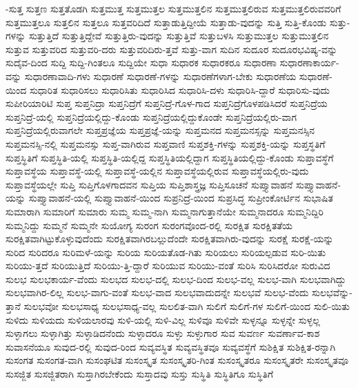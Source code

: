{-ಸುತ್ತ
ಸುತ್ತಣ
ಸುತ್ತತೊಡಗಿ
ಸುತ್ತಮುತ್ತ
ಸುತ್ತಮುತ್ತಲ
ಸುತ್ತಮುತ್ತಲಿನ
ಸುತ್ತಮುತ್ತಲಿರುವ
ಸುತ್ತಮುತ್ತಲಿರುವವರಿಗೆ
ಸುತ್ತಮುತ್ತಲೂ
ಸುತ್ತಲಿನ
ಸುತ್ತಲೂ
ಸುತ್ತವರಿದಿದೆ
ಸುತ್ತಾಡುತ್ತಿದ್ದೀಯೆ
ಸುತ್ತಾಡು-ವುದನ್ನು
ಸುತ್ತಿ
ಸುತ್ತಿ-ಕೊಂಡು
ಸುತ್ತು-ಗಳನ್ನು
ಸುತ್ತುತ್ತಿದೆ
ಸುತ್ತುತ್ತಿದ್ದೇವೆ
ಸುತ್ತುತ್ತಿರು-ವುದನ್ನು
ಸುತ್ತುತ್ತಿವೆ
ಸುತ್ತುಬಳಸಿ
ಸುತ್ತುಮುತ್ತಲ
ಸುತ್ತುಮುತ್ತಲಿನ
ಸುತ್ತುವ
ಸುತ್ತುವರಿದ
ಸುತ್ತುವರಿ-ದರು
ಸುತ್ತುವರಿದಿರು-ತ್ತವೆ
ಸುತ್ತು-ವಾಗ
ಸುದಿನ
ಸುದೂರ
ಸುದೂರಭವಿಷ್ಯ-ವನ್ನು
ಸುದೈವ-ದಿಂದ
ಸುದ್ದಿ
ಸುದ್ದಿ-ಗಿಂತಲೂ
ಸುದ್ದಿಯೇ
ಸುಧಾ
ಸುಧಾರಕ
ಸುಧಾರಕರೂ
ಸುಧಾರಣಾ
ಸುಧಾರಣಾಕಾರ್ಯ-ವನ್ನು
ಸುಧಾರಣಾವಾದಿ-ಗಳು
ಸುಧಾರಣೆ
ಸುಧಾರಣೆ-ಗಳನ್ನು
ಸುಧಾರಣೆಗಳಾಗ-ಬೇಕು
ಸುಧಾರಣೆಯ
ಸುಧಾರಣೆ-ಯಿಂದ
ಸುಧಾರಿತ
ಸುಧಾರಿಸಲು
ಸುಧಾರಿಸಿತು
ಸುಧಾರಿಸಿದ
ಸುಧಾರಿಸಿ-ದಳು
ಸುಧಾರಿಸಿ-ದ್ದಾರೆ
ಸುಧಾರಿಸು-ವುದು
ಸುಪೀರಿಯಾರಿಟಿ
ಸುಪ್ತ
ಸುಪ್ತನಿದ್ರಾ
ಸುಪ್ತನಿದ್ರೆಗೆ
ಸುಪ್ತನಿದ್ರೆ-ಗೊಳ-ಗಾದ
ಸುಪ್ತನಿದ್ರೆಗೊಳಪಡಿಸಿದರೆ
ಸುಪ್ತನಿದ್ರೆಯ
ಸುಪ್ತನಿದ್ರೆ-ಯಲ್ಲಿ
ಸುಪ್ತನಿದ್ರೆಯಲ್ಲಿದ್ದು-ಕೊಂಡು
ಸುಪ್ತನಿದ್ರೆಯಲ್ಲಿದ್ದುಕೊಂಡೇ
ಸುಪ್ತನಿದ್ರೆಯಲ್ಲಿರು-ವಾಗ
ಸುಪ್ತನಿದ್ರೆಯಲ್ಲಿರುವಾಗಲೇ
ಸುಪ್ತಪ್ರಜ್ಞೆಯ
ಸುಪ್ತಪ್ರಜ್ಞೆ-ಯನ್ನು
ಸುಪ್ತಮನದ
ಸುಪ್ತಮನಸ್ಸನ್ನು
ಸುಪ್ತಮನಸ್ಸಿನ
ಸುಪ್ತಮನಸ್ಸಿ-ನಲ್ಲಿ
ಸುಪ್ತಮನಸ್ಸು
ಸುಪ್ತ-ವಾಗಿರುವ
ಸುಪ್ತವಾಣಿ
ಸುಪ್ತಶಕ್ತಿ-ಗಳನ್ನು
ಸುಪ್ತಶಕ್ತಿ-ಯನ್ನು
ಸುಪ್ತಸ್ಥತಿಗೆ
ಸುಪ್ತಸ್ಥಿತಿಗೆ
ಸುಪ್ತಸ್ಥಿತಿ-ಯಲ್ಲಿ
ಸುಪ್ತಸ್ಥಿತಿ-ಯಲ್ಲಿದ್ದ
ಸುಪ್ತಸ್ಥಿತಿಯಲ್ಲಿದ್ದಾಗ
ಸುಪ್ತಸ್ಥಿತಿಯಲ್ಲಿದ್ದು-ಕೊಂಡು
ಸುಪ್ತಾವಸ್ಥೆಗೆ
ಸುಪ್ತಾವಸ್ಥೆಯ
ಸುಪ್ತಾವಸ್ಥೆ-ಯಲ್ಲಿ
ಸುಪ್ತಾವಸ್ಥೆ-ಯಲ್ಲಿನ
ಸುಪ್ತಾವಸ್ಥೆಯಲ್ಲಿರುವ
ಸುಪ್ತಾವಸ್ಥೆಯಲ್ಲಿರು-ವುದು
ಸುಪ್ತಾವಸ್ಥೆಯಲ್ಲೇ
ಸುಪ್ತಿ
ಸುಪ್ತಿಗೊಳಗಾದವನ
ಸುಪ್ತಿಯ
ಸುಪ್ತಿಶಾಸ್ತ್ರಜ್ಞ
ಸುಪ್ತಿಸೂಚನೆ
ಸುಪ್ತ್ಯಾವಾಹನೆ
ಸುಪ್ತ್ಯಾವಾಹನೆ-ಯನ್ನು
ಸುಪ್ತ್ಯಾವಾಹನೆ-ಯಲ್ಲಿ
ಸುಪ್ತ್ಯಾವಾಹನೆ-ಯಿಂದ
ಸುಪ್ರನಿದ್ರೆ-ಯಿಂದ
ಸುಪ್ರಸಿದ್ಧ
ಸುಪ್ರೀಂಕೋರ್ಟಿನ
ಸುಭಾಷಿತ
ಸುಮಾರಾಗಿ
ಸುಮಾರಿಗೆ
ಸುಮಾರು
ಸುಮ್ಮ
ಸುಮ್ಮ-ನಾಗಿ
ಸುಮ್ಮನಾಗುತ್ತಾನೆಯೇ
ಸುಮ್ಮನಾದರೂ
ಸುಮ್ಮನಿದ್ದಿರಿ
ಸುಮ್ಮನಿದ್ದು
ಸುಮ್ಮನೆ
ಸುಮ್ಮನೇ
ಸುಯೋಗ್ಯ
ಸುರಂಗ
ಸುರಂಗವೊಂದ-ರಲ್ಲಿ
ಸುರಕ್ಷಿತ
ಸುರಕ್ಷಿತತೆಯ
ಸುರಕ್ಷಿತವಾಗಿಟ್ಟುಕೊಳ್ಳುವುದೆಂದು
ಸುರಕ್ಷಿತವಾಗಿರಬಲ್ಲುದೆಂದೇ
ಸುರಕ್ಷಿತವಾಗಿರು-ವುದನ್ನು
ಸುರಕ್ಷೆ
ಸುರಕ್ಷೆ-ಯನ್ನು
ಸುರಿದ
ಸುರಿದರೂ
ಸುರಿಮಳೆ-ಯನ್ನು
ಸುರಿಯ
ಸುರಿಯತೊಡ-ಗಿತು
ಸುರಿಯಲು
ಸುರಿಯಲ್ಪಡುವ
ಸುರಿ-ಯಿತು
ಸುರಿಯು-ತ್ತದೆ
ಸುರಿಯುತ್ತಿದೆ
ಸುರಿಯು-ತ್ತಿ-ದ್ದಾರೆ
ಸುರಿಯುವ
ಸುರಿಯು-ವಂತೆ
ಸುರಿಸಿ
ಸುರಿಸಿದರೋ
ಸುರುವಿದ
ಸುಲಭ
ಸುಲಭಕಾರ್ಯ-ವೆಂದು
ಸುಲಭದ
ಸುಲಭ-ದಲ್ಲಿ
ಸುಲಭ-ದಿಂದ
ಸುಲಭ-ವಲ್ಲ
ಸುಲಭ-ವಾಗಿ
ಸುಲಭವಾಗಿದ್ದು
ಸುಲಭವಾಗಿರ-ಲಿಲ್ಲ
ಸುಲಭ-ವಾಗು-ವಂತೆ
ಸುಲಭ-ವಾದ
ಸುಲಭವಾದುದನ್ನೇ
ಸುಲಭವೆ
ಸುಲಭ-ವೆಂದು
ಸುಲಭವೆನ್ನು-ತ್ತಾನೆ
ಸುಲಭವೋ
ಸುಲಭಸಾಧ್ಯ
ಸುಲಭಸಾಧ್ಯ-ವಲ್ಲ
ಸುಲಲಿತ-ವಾಗಿ
ಸುಲಿಗೆ
ಸುಲಿಗೆ-ಗಳ
ಸುಲಿಗೆ-ಯಿಂದ
ಸುಲಿ-ಯಿತು
ಸುಳಿದು
ಸುಳಿಯದು
ಸುಳಿಯಲಾರವು
ಸುಳಿ-ಯಲ್ಲಿ
ಸುಳಿ-ವಿಲ್ಲ
ಸುಳಿವೂ
ಸುಳಿವೇ
ಸುಳ್ಳನ್ನೂ
ಸುಳ್ಳನ್ನೇ
ಸುಳ್ಳಲ್ಲ
ಸುಳ್ಳಾಗಲು
ಸುಳ್ಳಾಗಿತ್ತು
ಸುಳ್ಳಾಡಿದನೆಂದು
ಸುಳ್ಳಾದರೂ
ಸುಳ್ಳು
ಸುಳ್ಳುಗಾರ
ಸುವ
ಸುವರ್ಣ
ಸುವರ್ಣಾವ-ಕಾಶ
ಸುವಾಸನೆಯೂ
ಸುವುದ-ರಲ್ಲಿ
ಸುವುದ-ರಿಂದ
ಸುವ್ಯವಸ್ಥಿತ
ಸುವ್ಯವಸ್ಥಿತವೂ
ಸುವ್ಯವಸ್ಥೆಗೆ
ಸುಶಿಕ್ಷಿತ
ಸುಶಿಕ್ಷಿತ-ರನ್ನಾಗಿ
ಸುಸಂಗತ
ಸುಸಂಗತ-ವಾಗಿ
ಸುಸಂಘಟಿತ
ಸುಸಂಸ್ಕೃತ
ಸುಸಂಸ್ಕೃತರಿ-ಗಿಂತ
ಸುಸಂಸ್ಕೃತರೂ
ಸುಸಂಸ್ಕೃತರೇ
ಸುಸಂಸ್ಕೃತವೂ
ಸುಸಜ್ಜಿತ
ಸುಸಜ್ಜಿತರಾಗಿ
ಸುಸ್ತಾಗಿರಬೇಕೆಂದು
ಸುಸ್ತಾದವು
ಸುಸ್ತು
ಸುಸ್ಥಿತಿ
ಸುಸ್ಥಿತಿಗೂ
ಸುಸ್ಥಿತಿಗೆ
}

